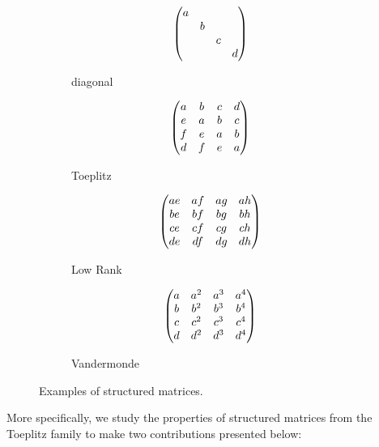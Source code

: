 \begin{figure}[ht]
   \centering
   \begin{subfigure}[t]{0.24\textwidth}
       \centering
       \begin{equation*}
	  \begin{pmatrix}
	    a &   &   &   \\
	      & b &   &   \\
	      &   & c &   \\
	      &   &   & d
	  \end{pmatrix}
       \end{equation*}
       \caption*{diagonal}
   \end{subfigure}
   \hfill
   \begin{subfigure}[t]{0.24\textwidth}
       \centering
       \begin{equation*}
	  \begin{pmatrix}
	    a & b & c & d \\
	    e & a & b & c \\
	    f & e & a & b \\
	    d & f & e & a
	  \end{pmatrix}
       \end{equation*}
       \caption*{Toeplitz}
   \end{subfigure}
   \hfill
   \begin{subfigure}[t]{0.24\textwidth}
       \centering
       \begin{equation*}
	  \begin{pmatrix}
	    ae & af & ag & ah \\
	    be & bf & bg & bh \\
	    ce & cf & cg & ch \\
	    de & df & dg & dh
	  \end{pmatrix}
       \end{equation*}
       \caption*{Low Rank}
   \end{subfigure}
   \hfill
   \begin{subfigure}[t]{0.24\textwidth}
       \centering
       \begin{equation*}
	  \begin{pmatrix}
	    a & a^2 & a^3 & a^4 \\
	    b & b^2 & b^3 & b^4 \\
	    c & c^2 & c^3 & c^4 \\
	    d & d^2 & d^3 & d^4
	  \end{pmatrix}
       \end{equation*}
       \caption*{Vandermonde}
   \end{subfigure}
  \caption{Examples of structured matrices.}
  \label{figure:example_structure_matrices}
\end{figure}

More specifically, we study the properties of structured matrices from the Toeplitz family to make two contributions presented below:

